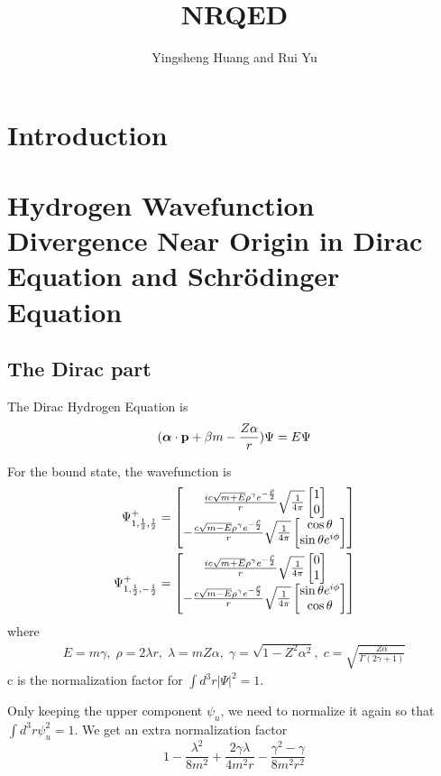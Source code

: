 \documentclass{article}
\title{NRQED}
\author{Yingsheng Huang and Rui Yu}
\newcommand{\vbp}{\vb{p}}
\renewcommand{\a}{\alpha}
\renewcommand{\b}{\beta}
\begin{document}
\maketitle
\section*{Introduction}
\section{Hydrogen Wavefunction Divergence Near Origin in Dirac Equation and Schr\"odinger Equation}
\subsection{The Dirac part}
The Dirac Hydrogen Equation is
\begin{align}
	(\bm{\a}\cdot \vbp+\b m-\frac{Z\a}{r} )\Psi=E\Psi
\end{align}

For the bound state, the wavefunction is\cite{Darwin1928,Gordon1928,Bethe2008}
\begin{align}
	\Psi^+_{1,\frac{1}{2},\frac{1}{2}}  & =\bmqty{\frac{ic\sqrt{m+E}\rho^{\gamma}e^{-\frac{\rho}{2}}}{r}\sqrt{\frac{1}{4\pi}}\bmqty{1 \\0}\\-\frac{c\sqrt{m-E}\rho^{\gamma}e^{-\frac{\rho}{2}}}{r}\sqrt{\frac{1}{4\pi}}\bmqty{\cos\theta\\\sin\theta e^{i\phi}}}\\
	\Psi^+_{1,\frac{1}{2},-\frac{1}{2}} & =\bmqty{\frac{ic\sqrt{m+E}\rho^{\gamma}e^{-\frac{\rho}{2}}}{r}\sqrt{\frac{1}{4\pi}}\bmqty{0 \\1}\\-\frac{c\sqrt{m-E}\rho^{\gamma}e^{-\frac{\rho}{2}}}{r}\sqrt{\frac{1}{4\pi}}\bmqty{\sin\theta e^{i\phi}\\\cos\theta}}
\end{align}
where
\begin{align}
	E=m\gamma,\;\rho=2\lambda r,\;\lambda=mZ\a,\;
	\gamma=\sqrt{1-Z^2\a^2},\;c=\sqrt{\frac{Z\a}{\Gamma(2\gamma+1)}}
\end{align}
c is the normalization factor for $\int d^3r|\Psi|^2=1$.

Only keeping the upper component $\psi_u$, we need to normalize it again so that $\int d^3r\psi_u^2=1$. We get an extra normalization factor
$$1-\frac{\lambda^2}{8m^2}+\frac{2\gamma\lambda}{4m^2r}-\frac{\gamma^2-\gamma}{8m^2r^2}$$
\end{document}
